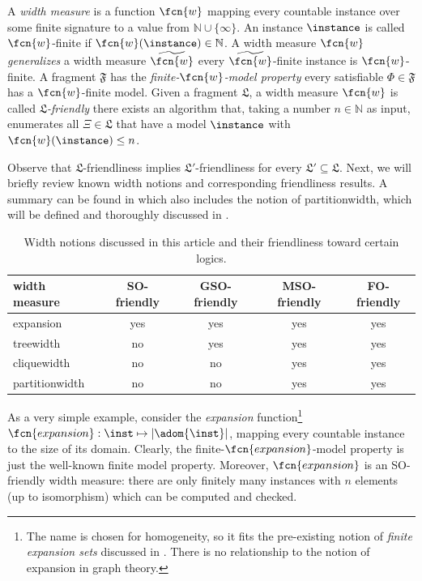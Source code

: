 \begin{definition}\label{def:MSOfriendly}
A \emph{width measure} is a function $\fcn{w}$ mapping every countable instance over some finite signature to a value from $\mathbb{N} \cup \{\infty\}$. An instance $\instance$ is called $\fcn{w}$-finite if $\fcn{w}(\instance)\in \mathbb{N}$.
A width measure $\fcn{w}$ \emph{generalizes} a width measure $\widetilde{\fcn{w}}$ \iffi
every $\widetilde{\fcn{w}}$-finite instance is $\fcn{w}$-finite.    
A fragment $\mathfrak{F}$ has the \emph{finite-$\fcn{w}$-model property} \iffi every satisfiable $\Phi \in \mathfrak{F}$ has a $\fcn{w}$-finite model. 
Given a fragment $\mathfrak{L}$, a width measure $\fcn{w}$ is called \emph{$\mathfrak{L}$-friendly} \iffi  
there exists an algorithm that, taking a number $n \in \mathbb{N}$ as input, enumerates all $\Xi \in \mathfrak{L}$ 
that have a model $\instance$ with $\fcn{w}(\instance)\leq n$.
\end{definition}

Observe that $\mathfrak{L}$-friendliness implies $\mathfrak{L}'$-friendliness for every $\mathfrak{L}'\subseteq\mathfrak{L}$. 
Next, we will briefly review known width notions and corresponding friendliness results. A summary can be found in  which also includes the notion of partitionwidth, which will be defined and thoroughly discussed in . 

\begin{table}%
	\begin{center}
		\begin{tabular}{lcccc}
			width measure  & SO-friendly & GSO-friendly & MSO-friendly & FO-friendly \\\hline
			expansion & yes & yes & yes & yes \\ 
			treewidth & no & yes & yes & yes \\
			cliquewidth & no & no & yes & yes \\
			partitionwidth & no & no & yes & yes \\\hline
		\end{tabular}
		\caption{Width notions discussed in this article and their friendliness toward certain logics.\label{tab:friendly}}
	\end{center}
\end{table}

\medskip {}
As a very simple example, consider the \emph{expansion} function\footnote{The name is chosen for homogeneity, so it fits the pre-existing notion of \emph{finite expansion sets} discussed in . There is no relationship to the notion of expansion in graph theory.} $\fcn{expansion}: \inst \mapsto |\adom{\inst}|$, mapping every countable instance to the size of its domain. Clearly, the finite-$\fcn{expansion}$-model property is just the well-known finite model property. Moreover, $\fcn{expansion}$ is an SO-friendly width measure: there are only finitely many instances with $n$ elements (up to isomorphism) which can be computed and checked. 


